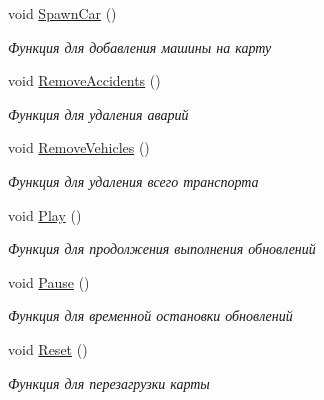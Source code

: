 \begin{DoxyCompactItemize}
void \hyperlink{classrtm_1_1_world_controller_ae9fbdfd9f1b5a9dafe74c0eb1b3919bc}{Spawn\+Car} ()
\begin{DoxyCompactList}\small\item\em Функция для добавления машины на карту \end{DoxyCompactList}\item 
\mbox{\label{classrtm_1_1_world_controller_a8d3e8c8133111ad23a9f8c23fb31c6d2}} 
void \hyperlink{classrtm_1_1_world_controller_a8d3e8c8133111ad23a9f8c23fb31c6d2}{Remove\+Accidents} ()
\begin{DoxyCompactList}\small\item\em Функция для удаления аварий \end{DoxyCompactList}\item 
\mbox{\label{classrtm_1_1_world_controller_a31576a18588c9f736298f96ceefd48d4}} 
void \hyperlink{classrtm_1_1_world_controller_a31576a18588c9f736298f96ceefd48d4}{Remove\+Vehicles} ()
\begin{DoxyCompactList}\small\item\em Функция для удаления всего транспорта \end{DoxyCompactList}\item 
\mbox{\label{classrtm_1_1_world_controller_a36cb8912de7839fbc337a81f24bac1c7}} 
void \hyperlink{classrtm_1_1_world_controller_a36cb8912de7839fbc337a81f24bac1c7}{Play} ()
\begin{DoxyCompactList}\small\item\em Функция для продолжения выполнения обновлений \end{DoxyCompactList}\item 
\mbox{\label{classrtm_1_1_world_controller_a69bc1f11010c2ec18ed5afcde9ea2346}} 
void \hyperlink{classrtm_1_1_world_controller_a69bc1f11010c2ec18ed5afcde9ea2346}{Pause} ()
\begin{DoxyCompactList}\small\item\em Функция для временной остановки обновлений \end{DoxyCompactList}\item 
\mbox{\label{classrtm_1_1_world_controller_af682ce5179e826d1cc93f52f3c288905}} 
void \hyperlink{classrtm_1_1_world_controller_af682ce5179e826d1cc93f52f3c288905}{Reset} ()
\begin{DoxyCompactList}\small\item\em Функция для перезагрузки карты \end{DoxyCompactList}\end{DoxyCompactItemize}
